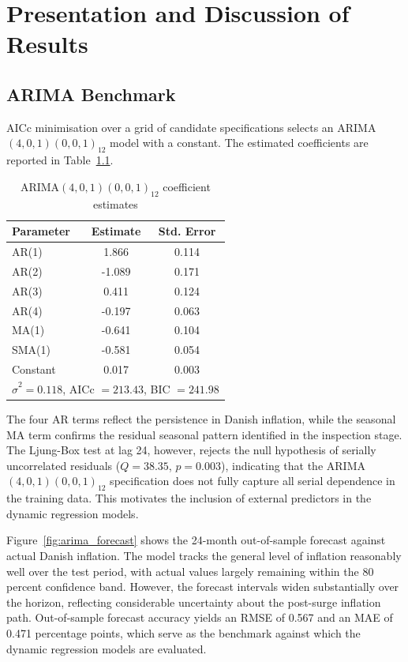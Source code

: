 \chapter{Presentation and Discussion of Results}\label{sec:results}

\section{ARIMA Benchmark}

AICc minimisation over a grid of candidate specifications selects an 
ARIMA$(4,0,1)(0,0,1)_{12}$ model with a constant. The estimated coefficients 
are reported in Table~\ref{tab:arima_coef}.

\begin{table}[H]
\centering
\caption{ARIMA$(4,0,1)(0,0,1)_{12}$ coefficient estimates}
\begin{tabular}{lcc}
\hline
Parameter & Estimate & Std. Error \\
\hline
AR(1)       &  1.866 & 0.114 \\
AR(2)       & -1.089 & 0.171 \\
AR(3)       &  0.411 & 0.124 \\
AR(4)       & -0.197 & 0.063 \\
MA(1)       & -0.641 & 0.104 \\
SMA(1)      & -0.581 & 0.054 \\
Constant    &  0.017 & 0.003 \\
\hline
\multicolumn{3}{l}{$\hat{\sigma}^2 = 0.118$, AICc $= 213.43$, BIC $= 241.98$} \\
\hline
\end{tabular}
\label{tab:arima_coef}
\end{table}

The four AR terms reflect the persistence in Danish inflation, while the 
seasonal MA term confirms the residual seasonal pattern identified in the 
inspection stage. The Ljung-Box test at lag 24, however, rejects the null 
hypothesis of serially uncorrelated residuals ($Q = 38.35$, $p = 0.003$), 
indicating that the ARIMA$(4,0,1)(0,0,1)_{12}$ specification does not fully 
capture all serial dependence in the training data. This motivates the 
inclusion of external predictors in the dynamic regression models.

Figure~\ref{fig:arima_forecast} shows the 24-month out-of-sample forecast 
against actual Danish inflation. The model tracks the general level of 
inflation reasonably well over the test period, with actual values largely 
remaining within the 80 percent confidence band. However, the forecast 
intervals widen substantially over the horizon, reflecting considerable 
uncertainty about the post-surge inflation path. Out-of-sample forecast 
accuracy yields an RMSE of 0.567 and an MAE of 0.471 percentage points, 
which serve as the benchmark against which the dynamic regression models 
are evaluated.

